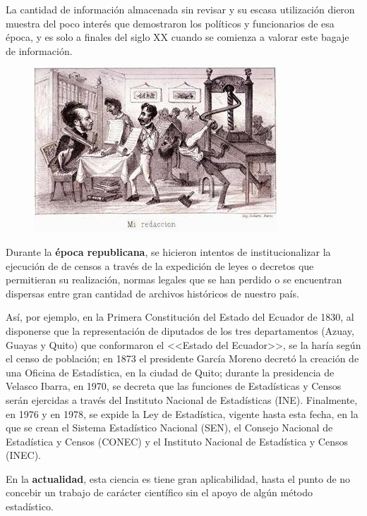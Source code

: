 \documentclass[a5paper,doc,10pt,noapacite]{apa6}
\begin{document}
{{\vspace{1\baselineskip}
La cantidad de información almacenada sin revisar y su escasa utilización dieron muestra del poco interés que demostraron los políticos y funcionarios de esa época, y es solo a finales del siglo XX cuando se comienza a valorar este bagaje de información.

\begin{figure} %
    \centering
    \includegraphics[scale=0.3]{Graficos/fig1_GC.jpg}
\end{figure}

Durante la \textbf{época republicana}, se hicieron intentos de institucionalizar la ejecución de de censos a través de la expedición de leyes o decretos que permitieran su realización, normas legales que se han perdido o se encuentran dispersas entre gran cantidad de archivos históricos de nuestro país. 

\vspace{1\baselineskip}
Así, por ejemplo, en la Primera Constitución del Estado del Ecuador de 1830, al disponerse que la representación de diputados de los tres departamentos (Azuay, Guayas y Quito) que conformaron el <<Estado del Ecuador>>, se la haría según el censo de población; en 1873 el presidente García Moreno decretó la creación de una Oficina de Estadística, en la ciudad de Quito; durante la presidencia de Velasco Ibarra, en 1970, se decreta que las funciones de Estadísticas y Censos serán ejercidas a través del Instituto Nacional de Estadísticas (INE). Finalmente, en 1976 y en 1978, se expide la Ley de Estadística, vigente hasta esta fecha, en la que se crean el Sistema Estadístico Nacional (SEN), el Consejo Nacional de Estadística y Censos (CONEC) y el Instituto Nacional de Estadística y Censos (INEC).

\vspace{1\baselineskip}
En la \textbf{actualidad}, esta ciencia es tiene gran aplicabilidad, hasta el punto de no concebir un trabajo de carácter científico sin el apoyo de algún método estadístico. 

}}
\end{document}
